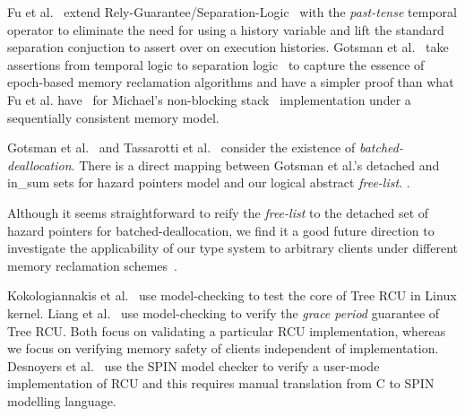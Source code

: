  Fu et al.~\cite{shao_temp} extend Rely-Guarantee/Separation-Logic~\cite{vafeiadis07,Feng:2007:RCS:1762174.1762193,Feng:2009:LRR:1480881.1480922} with the \textit{past-tense} temporal operator to eliminate the need for using a history variable and lift the standard separation conjuction to assert over on execution histories. Gotsman et al.~\cite{Gotsman:2013:VCM:2450268.2450289} take assertions from temporal logic to separation logic~\cite{vafeiadis07} to capture the essence of epoch-based memory reclamation algorithms and have a simpler proof than what Fu et al. have~\cite{shao_temp} for Michael's non-blocking stack~\cite{Michael:2004:HPS:987524.987595} implementation under a sequentially consistent memory model.

 Gotsman et al.~\cite{Gotsman:2013:VCM:2450268.2450289} and Tassarotti et al.~\cite{verrcu} consider the existence of \textit{batched-deallocation}. There is a direct mapping between Gotsman et al.'s \textsf{detached} and \textsf{in\_sum} sets for hazard pointers model and our logical abstract \textit{free-list}. .

Although it seems straightforward to reify the \textit{free-list} to the \textsf{detached} set of hazard pointers for batched-deallocation, we find it a good future direction to investigate the applicability of our type system to arbitrary clients under different memory reclamation schemes~\cite{Wen:2018:IMR:3178487.3178488,Michael:2004:HPS:987524.987595,Mckenney:2004:EDD:1048173,UCAM-CL-TR-579}.
%

 Kokologiannakis et al.~\cite{Kokologiannakis:2017:SMC:3092282.3092287} use model-checking to test the core of \textsf{Tree RCU} in Linux kernel. Liang et al.~\cite{LiangMKM16} use model-checking to verify the \emph{grace period} guarantee of \textsf{Tree RCU}. Both focus on validating a particular RCU implementation, whereas we focus on verifying memory safety of clients independent of implementation. Desnoyers et al.~\cite{urcu_ieee} use the \textsf{SPIN} model checker to verify a user-mode implementation of RCU and this requires manual translation from C to SPIN modelling language.

